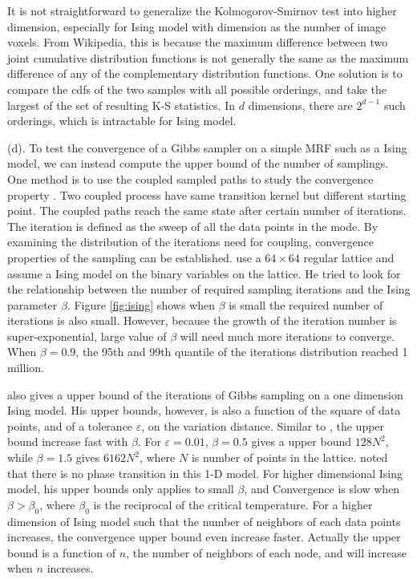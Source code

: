 \documentclass[12pt]{article}
\begin{document}
It is not straightforward to generalize the Kolmogorov-Smirnov test into higher
dimension, especially for Ising model with dimension as the number of image
voxels. From Wikipedia, this is because the maximum difference between two joint
cumulative distribution functions is not generally the same as the maximum
difference of any of the complementary distribution functions. One solution is
to compare the cdfs of the two samples with all possible orderings, and take the
largest of the set of resulting K-S statistics. In $d$ dimensions, there are
$2^{d-1}$ such orderings, which is intractable for Ising model.


(d). To test the convergence of a Gibbs sampler on a simple MRF such as a Ising
model, we can instead compute the upper bound of the number of samplings. One
method is to use the coupled sampled paths to study the convergence property
\citep{johnson1996studying}. Two coupled process have same transition kernel but
different starting point. The coupled paths reach the same state after certain number
of iterations. The iteration is defined as the sweep of all the data points in
the mode.  By examining the distribution of the iterations need for coupling,
convergence properties of the sampling can be
established. \citeauthor{johnson1996studying} use a $64\times64$ regular lattice
and assume a Ising model on the binary variables on the lattice. He tried to
look for the relationship between the number of required sampling iterations and
the Ising parameter $\beta$. Figure \ref{fig:ising} shows when $\beta$ is small
the required number of iterations is also small. However, because the growth of
the iteration number is super-exponential, large value of $\beta$ will need much
more iterations to converge. When $\beta=0.9$, the 95th and 99th quantile of the
iterations distribution reached 1 million.

\citet{gibbs2000bounding} also gives a upper bound of the iterations of Gibbs
sampling on a one dimension Ising model. His upper bounds, however, is also a
function of the square of data points, and of a tolerance $\varepsilon$, on the
variation distance. Similar to \citeauthor{johnson1996studying}, the upper bound
increase fast with $\beta$. For $\varepsilon = 0.01$, $\beta=0.5$ gives a upper
bound $128N^2$, while $\beta=1.5$ gives $6162N^2$, where $N$ is number of points
in the lattice. \citeauthor{gibbs2000bounding} noted that there is no phase
transition in this 1-D model. For higher dimensional Ising model, his upper
bounds only applies to small $\beta$, and Convergence is slow when $\beta >
\beta_0$, where $\beta_0$ is the reciprocal of the critical temperature. For a
higher dimension of Ising model such that the number of neighbors of each data
points increases, the convergence upper bound even increase faster. Actually the
upper bound is a function of $n$, the number of neighbors of each node, and will
increase when $n$ increases.
\end{document}
